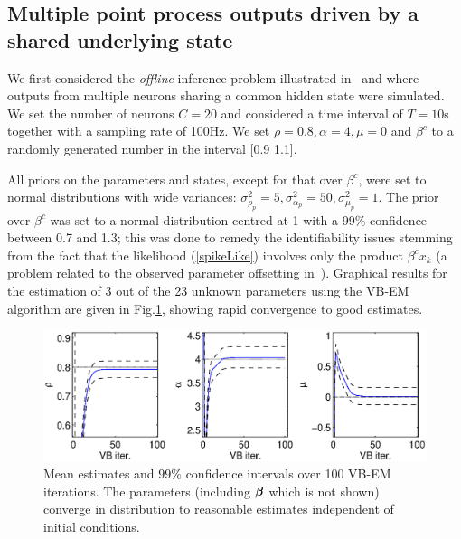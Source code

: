 \documentclass[12pt]{article}
\begin{document}
\subsection{Multiple point process outputs driven by a shared underlying state}

We first considered the \emph{offline} inference problem illustrated in~\cite{Smith_2003} and
\cite{Yuan_2010} where outputs from multiple neurons sharing a common hidden state were simulated.
We set the number of neurons $C = 20$ and considered a time interval of $T=10$s together with a
sampling rate of 100Hz. We set $\rho = 0.8, \alpha = 4, \mu = 0$ and $\beta^c$ to a randomly
generated number in the interval [0.9 1.1].

All priors on the parameters and states, except for that over $\beta^c$, were set to normal
distributions with wide variances: $\sigma^2_{\rho_p} = 5, \sigma^2_{\alpha_p} = 50,
\sigma^2_{\mu_p} = 1$. The prior over $\beta^c$ was set to a normal distribution centred at 1 with a
99$\%$ confidence between 0.7 and 1.3; this was done to remedy the identifiability issues stemming
from the fact that the likelihood (\ref{spikeLike}) involves only the product $\beta^c x_k$ (a
problem related to the observed parameter offsetting in~\cite{Smith_2003}). Graphical results for the estimation of 3 out of the 23
unknown parameters using the VB-EM algorithm are given in Fig.\ref{fig:parVB}, showing rapid
convergence to good estimates.


%
% 	

\begin{figure}[ht]
\begin{center}
\includegraphics[width = 5.5in]{./Figures/parVB.eps}
\caption{Mean estimates and $99\%$ confidence intervals over 100 VB-EM iterations. The
parameters (including ${\bm \beta}$ which is not shown) converge in distribution to reasonable estimates
independent of initial conditions.} \label{fig:parVB}
\end{center}
\end{figure}
\end{document}
